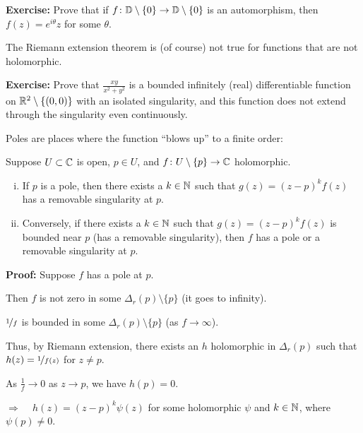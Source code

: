\documentclass[10pt,aspectratio=169]{beamer}
\begin{document}
\begin{frame}

\textbf{Exercise:}
Prove that if $f \colon {\mathbb{D}} \setminus \{ 0 \} \to {\mathbb{D}} \setminus \{ 0 \}$
is an automorphism, then $f(z) = e^{i\theta} z$ for some $\theta$.

\medskip
\pause

The Riemann extension theorem is (of course) not true for functions that are
not holomorphic.

\medskip
\pause

\textbf{Exercise:}
Prove that $\frac{xy}{x^2+y^2}$ is a bounded infinitely 
(real) differentiable function
on ${\mathbb{R}}^2 \setminus \{ (0,0) \}$ with an isolated singularity, and this
function does not
extend through the singularity even continuously.

\end{frame}

\begin{frame}
Poles are places where the function ``blows up'' to a finite order:

\pause

\begin{corollary}
Suppose $U \subset {\mathbb{C}}$ is open, $p \in U$,
and $f \colon U \setminus \{p\} \to {\mathbb{C}}$ holomorphic.
\pause
\begin{enumerate}[(i)]
\item
If $p$ is a pole, then there exists a $k \in {\mathbb{N}}$ such that
$g(z) = {(z-p)}^k f(z)$
has a removable singularity at $p$.
\pause
\item
Conversely, if there exists a $k \in {\mathbb{N}}$ such that
$g(z) = {(z-p)}^k f(z)$ is bounded near $p$ (has a removable singularity),
then $f$ has a pole or a
removable singularity at $p$.
\end{enumerate}
\end{corollary}

\pause
\textbf{Proof:}
Suppose $f$ has a pole at $p$.

\medskip
\pause

Then $f$ is not zero in some $\Delta_r(p) \setminus \{p\}$ (it goes to
infinity).

\medskip
\pause

$\nicefrac{1}{f}$ is bounded in some $\Delta_r(p) \setminus \{p\}$
(as $f \to \infty$).

\medskip
\pause

Thus, by Riemann extension, there exists an $h$ holomorphic in $\Delta_r(p)$
such that $h(z) = \nicefrac{1}{f(z)}$ for $z \not= p$.

\medskip
\pause

As $\frac{1}{f} \to 0$ as $z \to p$, we have $h(p) = 0$.

\medskip
\pause

$\Rightarrow$ ~ $h(z) = {(z-p)}^k \psi(z)$ for some holomorphic $\psi$ and $k \in {\mathbb{N}}$,
where $\psi(p) \not= 0$.

\end{frame}
\end{document}
